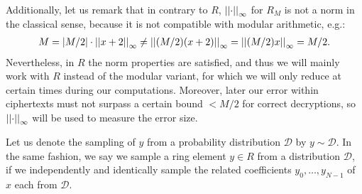 \documentclass[letterpaper,10pt,english]{jupyterBook}
\begin{document}
\sphinxAtStartPar
Additionally, let us remark that in contrary to \(R\), \(\left\lvert\left\lvert \cdot \right\rvert\right\rvert_\infty\) for \(R_M\) is not a norm in the classical sense, because it is not compatible with modular arithmetic, e.g.:
\begin{equation*}
\begin{split}M = \left\lvert M/2 \right\rvert \cdot \left\lvert\left\lvert x+2 \right\rvert\right\rvert_\infty \neq \left\lvert\left\lvert (M/2)(x+2) \right\rvert\right\rvert_\infty = \left\lvert\left\lvert (M/2)x \right\rvert\right\rvert_\infty = M/2.\end{split}
\end{equation*}
\sphinxAtStartPar
Nevertheless, in \(R\) the norm properties are satisfied, and thus we will mainly work with \(R\) instead of the modular variant, for which we will only reduce at certain times during our computations.
Moreover, later our error within ciphertexts must not surpass a certain bound \(< M/2\) for correct decryptions, so \(\left\lvert\left\lvert \cdot \right\rvert\right\rvert_\infty\) will be used to measure the error size.

\label{\detokenize{Thesis:background-on-probability-theory}}
\begin{DUlineblock}{0em}
\item[] 
\end{DUlineblock}

\begin{DUlineblock}{0em}
\item[] 
\end{DUlineblock}

\sphinxAtStartPar
Let us denote the sampling of \(y\) from a probability distribution \(\mathcal D\) by \(y \sim \mathcal D\).
In the same fashion, we say we sample a ring element \(y \in R\) from a distribution \(\mathcal D\), if we independently and identically sample the related coefficients \(y_0, \dots, y_{N-1}\) of \(x\) each from \(\mathcal D\).
\end{document}
